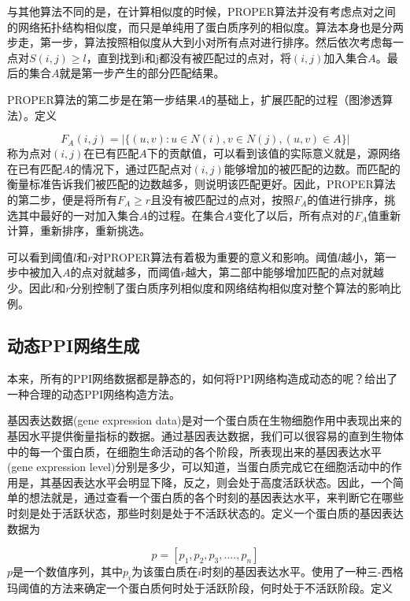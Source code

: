 与其他算法不同的是，在计算相似度的时候，PROPER算法并没有考虑点对之间的网络拓扑结构相似度，而只是单纯用了蛋白质序列的相似度。算法本身也是分两步走，第一步，算法按照相似度从大到小对所有点对进行排序。然后依次考虑每一点对$S(i,j)\geq l$，直到找到i和j都没有被匹配过的点对，将$(i,j)$加入集合$A$。最后的集合$A$就是第一步产生的部分匹配结果。

PROPER算法的第二步是在第一步结果$A$的基础上，扩展匹配的过程（图渗透算法）。定义

\begin{equation}\label{proper2}
F_A(i,j)=\left | \{(u,v):u\in N(i),v\in N(j),(u,v)\in A\} \right |
\end{equation}
称为点对$(i,j)$在已有匹配$A$下的贡献值，可以看到该值的实际意义就是，源网络在已有匹配$A$的情况下，通过匹配点对$(i,j)$能够增加的被匹配的边数。而匹配的衡量标准告诉我们被匹配的边数越多，则说明该匹配更好。因此，PROPER算法的第二步，便是将所有$F_A\geq r$且没有被匹配过的点对，按照$F_A$的值进行排序，挑选其中最好的一对加入集合$A$的过程。在集合$A$变化了以后，所有点对的$F_A$值重新计算，重新排序，重新挑选。

可以看到阈值$l$和$r$对PROPER算法有着极为重要的意义和影响。阈值$l$越小，第一步中被加入$A$的点对就越多，而阈值$r$越大，第二部中能够增加匹配的点对就越少。因此$l$和$r$分别控制了蛋白质序列相似度和网络结构相似度对整个算法的影响比例。

\subsection{动态PPI网络生成}
本来，所有的PPI网络数据都是静态的，如何将PPI网络构造成动态的呢？\cite{zhang2016method}给出了一种合理的动态PPI网络构造方法。

基因表达数据(gene expression data)是对一个蛋白质在生物细胞作用中表现出来的基因水平提供衡量指标的数据。通过基因表达数据，我们可以很容易的直到生物体中的每一个蛋白质，在细胞生命活动的各个阶段，所表现出来的基因表达水平(gene expression level)分别是多少，可以知道，当蛋白质完成它在细胞活动中的作用是，其基因表达水平会明显下降，反之，则会处于高度活跃状态。因此，一个简单的想法就是，通过查看一个蛋白质的各个时刻的基因表达水平，来判断它在哪些时刻是处于活跃状态，那些时刻是处于不活跃状态的。定义一个蛋白质的基因表达数据为

\begin{equation}\label{dppi1}
p=[ p_1,p_2,p_3,....,p_n]
\end{equation}
$p$是一个数值序列，其中$p_i$为该蛋白质在$i$时刻的基因表达水平。\cite{zhang2016method}使用了一种三-西格玛阈值的方法来确定一个蛋白质何时处于活跃阶段，何时处于不活跃阶段。定义

